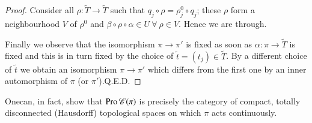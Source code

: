 \begin{proof}
Consider all $\rho:\widetilde{T}\to \widetilde{T}$ such that
$q_{j}\circ\rho=\rho^{0}_{j}\circ q_{j}$; these $\rho$ form a
neighbourhood $V$ of $\rho^{0}$ and $\beta\circ\rho\circ\alpha\in
U\ \forall\ \rho\in V$. Hence we are through.

Finally we observe that the isomorphism $\pi\to \pi'$ is fixed as soon
as $\alpha:\pi\to \widetilde{T}$ is fixed and this is in turn fixed by
the choice of $\widetilde{t}=(t_{j})\in\widetilde{T}$. By a different
choice of $\widetilde{t}$ we obtain an isomorphism $\pi\to \pi'$ which
differs from the first one by an inner automorphism of $\pi$ (or
$\pi'$).\hfill Q.E.D. 
\end{proof}

\setcounter{subremark}{11}
\begin{subremark}\label{chap4-rem4.4.1.12}
One\pageoriginale can, in fact, show that $\operatorname{Pro}\mathscr{C}(\pi)$ is
precisely the category of compact, totally disconnected (Hausdorff)
topological spa\-ces on which $\pi$ acts continuously.
\end{subremark}
